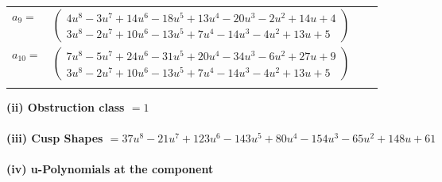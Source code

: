 \documentclass[1p]{elsarticle_modified}
\theoremstyle{definition}
\begin{document}
\begin{tabular}{m{7pt} m{180pt} m{7pt} m{180pt} }
\flushright $a_{9}=$&$\begin{pmatrix}4 u^8-3 u^7+14 u^6-18 u^5+13 u^4-20 u^3-2 u^2+14 u+4\\3 u^8-2 u^7+10 u^6-13 u^5+7 u^4-14 u^3-4 u^2+13 u+5\end{pmatrix}$ \\
\flushright $a_{10}=$&$\begin{pmatrix}7 u^8-5 u^7+24 u^6-31 u^5+20 u^4-34 u^3-6 u^2+27 u+9\\3 u^8-2 u^7+10 u^6-13 u^5+7 u^4-14 u^3-4 u^2+13 u+5\end{pmatrix}$\\&\end{tabular}
\flushleft \textbf{(ii) Obstruction class $= 1$}\\~\\
\flushleft \textbf{(iii) Cusp Shapes $= 37 u^8-21 u^7+123 u^6-143 u^5+80 u^4-154 u^3-65 u^2+148 u+61$}\\~\\
\newpage\renewcommand{\arraystretch}{1}
\flushleft \textbf{(iv) u-Polynomials at the component}\newline \\
\end{document}
